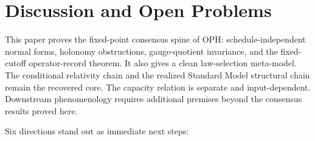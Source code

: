 \documentclass[11pt]{article}
\theoremstyle{remark}
\theoremstyle{plain}
\begin{document}
\section{Discussion and Open Problems}

This paper proves the fixed-point consensus spine of OPH: schedule-independent normal forms,
holonomy obstructions, gauge-quotient invariance, and the fixed-cutoff operator-record theorem.
It also gives a
clean law-selection meta-model. The conditional relativity chain and the realized Standard Model
structural chain remain the recovered core. The capacity relation is separate and input-dependent.
Downstream phenomenology requires additional premises beyond the consensus results proved here.

Six directions stand out as immediate next steps:
\end{document}
